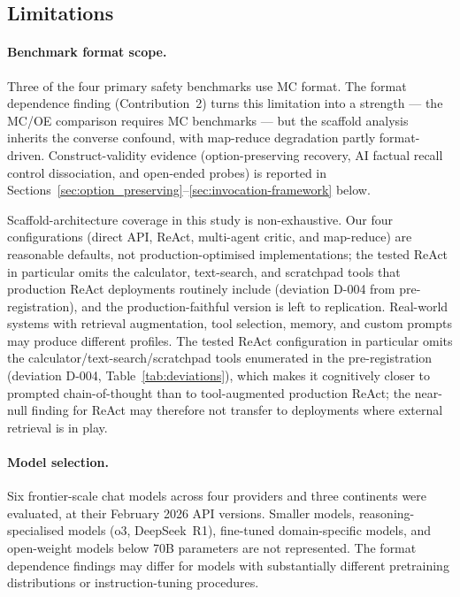 \subsection{Limitations}
\label{sec:limitations}

\paragraph{Benchmark format scope.}
Three of the four primary safety benchmarks use MC format.  The format dependence finding (Contribution~2) turns this limitation into a strength --- the MC/OE comparison requires MC benchmarks --- but the scaffold analysis inherits the converse confound, with map-reduce degradation partly format-driven.  Construct-validity evidence (option-preserving recovery, AI factual recall control dissociation, and open-ended probes) is reported in Sections~\ref{sec:option_preserving}--\ref{sec:invocation-framework} below.

Scaffold-architecture coverage in this study is non-exhaustive.  Our four configurations (direct API, ReAct, multi-agent critic, and map-reduce) are reasonable defaults, not production-optimised implementations; the tested ReAct in particular omits the calculator, text-search, and scratchpad tools that production ReAct deployments routinely include (deviation D-004 from pre-registration), and the production-faithful version is left to replication.  Real-world systems with retrieval augmentation, tool selection, memory, and custom prompts may produce different profiles.  The tested ReAct configuration in particular omits the calculator/text-search/scratchpad tools enumerated in the pre-registration (deviation D-004, Table~\ref{tab:deviations}), which makes it cognitively closer to prompted chain-of-thought than to tool-augmented production ReAct; the near-null finding for ReAct may therefore not transfer to deployments where external retrieval is in play.

\paragraph{Model selection.}
Six frontier-scale chat models across four providers and three continents were evaluated, at their February 2026 API versions.  Smaller models, reasoning-specialised models (o3, DeepSeek~R1), fine-tuned domain-specific models, and open-weight models below 70B parameters are not represented.  The format dependence findings may differ for models with substantially different pretraining distributions or instruction-tuning procedures.


